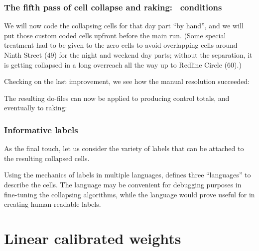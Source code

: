 \subsubsection{The fifth pass of cell collapse and raking: \ifexp\ conditions}

We will now code the collapsing cells for that day part ``by hand'', and we will put those
custom coded cells upfront before the main run. (Some special treatment had to be given
to the zero cells to avoid overlapping cells around Ninth Street (49) for the night and weekend
day parts; without the separation, it is getting collapsed in a long overreach all the way up to
Redline Circle (60).)

\begin{stlog}
\nullskip
\end{stlog}

Checking on the last improvement, we see how the manual resolution succeeded:

\begin{stlog}
\nullskip
\end{stlog}

The resulting do-files can now be applied to producing control totals, and eventually to raking:

\begin{stlog}
\nullskip
\end{stlog}

\subsubsection{Informative labels}
\label{subsec:wgtcellcollapse:labels}

As the final touch, let us consider the variety of labels that can be attached to the resulting
collapsed cells.

\begin{stlog}
\nullskip
\end{stlog}

Using the mechanics of labels in multiple languages,  defines three
``languages'' to describe the cells. The language  may be convenient
for debugging purposes in fine-tuning the collapsing algorithms, while the language
 would prove useful for  in creating human-readable
labels.

\section{Linear calibrated weights}
\label{subsec:linear}

